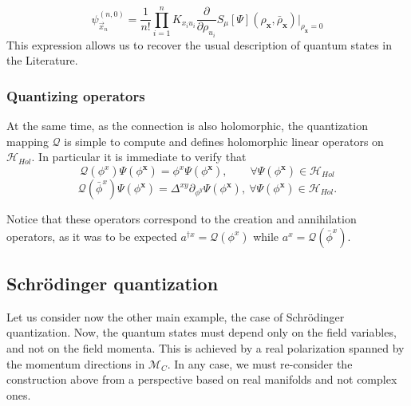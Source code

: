 \documentclass[12pt]{article}%
\begin{document}
    \begin{equation}
        \label{eq:wienerItoSeagalwithTtransform2}
        \psi^{(n,0)}_{\vec{x}_n}=\frac{1}{n!}\prod_{i=1}^n K_{x_iu_i}\frac{\partial}{\partial \rho_{u_i}}  {S_\mu[\Psi](\rho_\mathbf{x},\bar{\rho}_\mathbf{x})} \bigg\lvert_{\rho_\mathbf{x}=0}
        \end{equation}
This expression allows us to recover the usual description of quantum states in the Literature.

\subsubsection{Quantizing operators}
At the same time, as the connection is also holomorphic, the quantization mapping $\mathcal{Q}$ is simple to compute and defines holomorphic linear operators on $\mathcal{H}_{Hol}$. In particular it is immediate to verify that
\begin{equation}
\label{eq:operator_field}
\mathcal{Q}(\phi^x) \Psi(\phi^\mathbf{x})=\phi^x \Psi(\phi^\mathbf{x}), \qquad \forall \Psi(\phi^\mathbf{x})\in \mathcal{H}_{Hol}
\end{equation}
\begin{equation}
    \label{eq:operator_momentum}
    \mathcal{Q}(\bar \phi^x) \Psi(\phi^\mathbf{x})=\Delta^{xy}\partial_{\phi^y }\Psi(\phi^\mathbf{x}),\  \forall \Psi(\phi^\mathbf{x})\in \mathcal{H}_{Hol}.
    \end{equation}

Notice that these operators correspond to the creation and annihilation operators, as it was to be expected  ${a^{\dagger x}}=\mathcal{Q}(\phi^x)$ while $a^x=\mathcal{Q}(\bar \phi^x)$.

\subsection{Schrödinger quantization}

Let us consider now the other main example, the case of Schrödinger quantization. Now, the quantum states must depend only on the field variables, and not on the field momenta.  This is achieved by a real polarization spanned by the momentum directions in $\mathcal{M}_C$. In any case, we must re-consider the construction above from a perspective based on real manifolds and not complex ones. 
\end{document}

